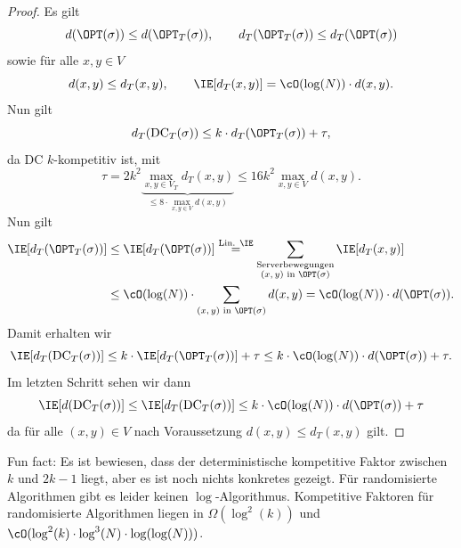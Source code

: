 \documentclass[language=ngerman,algolist]{TemplateLecture}
\begin{document}
\begin{proof}
    Es gilt
    \begin{equation*}
        d(\OPT(\sigma)) \leq d(\OPT_T(\sigma)), \quad \quad d_T(\OPT_T(\sigma)) \leq d_T(\OPT(\sigma))
    \end{equation*}
    sowie für alle $x, y  \in V$
    \begin{equation*}
        d(x,y) \leq d_T(x,y), \quad \quad \IE[d_T(x,y)] = \cO(\log(N)) \cdot d(x,y).
    \end{equation*}
    Nun gilt 
    \begin{equation*}
        d_T(\text{DC}_T(\sigma)) \leq k \cdot d_T(\OPT_T(\sigma)) + \tau,
    \end{equation*}
    da DC $k$-kompetitiv ist, mit 
    \begin{equation*}
        \tau = 2k^2 \underset{\leq 8\cdot\max_{x,y \in V} d(x,y)}{\underbrace{\max_{x,y \in V_T} d_T(x,y)}} \leq 16k^2 \max_{x,y \in V} d(x,y).
    \end{equation*}
    Nun gilt 
    \begin{equation*}
        \begin{split}
            \IE[d_T(\OPT_T(\sigma))] & \leq \IE[d_T(\OPT(\sigma))] \overset{\text{Lin. $\IE$}}{=} \sum_{\substack{\text{Serverbewegungen} \\ \text{$(x,y)$ in $\OPT(\sigma)$}}}\IE[d_T(x,y)] \\ 
            & \leq \cO(\log(N)) \cdot \sum_{\text{$(x,y)$ in $\OPT(\sigma)$}} d(x,y) = \cO(\log(N)) \cdot d(\OPT(\sigma)).
        \end{split}
    \end{equation*}
    Damit erhalten wir 
    \begin{equation*}
        \IE[d_T(\text{DC}_T(\sigma))] \leq k \cdot \IE[d_T(\OPT_T(\sigma))] + \tau \leq k \cdot \cO(\log(N)) \cdot d(\OPT(\sigma)) + \tau.
    \end{equation*}
    Im letzten Schritt sehen wir dann 
    \begin{equation*}
        \IE[d(\text{DC}_T(\sigma))] \leq \IE[d_T(\text{DC}_T(\sigma))] \leq k \cdot \cO(\log(N)) \cdot d(\OPT(\sigma)) + \tau
    \end{equation*}
    da für alle $(x,y) \in V$ nach Voraussetzung $d(x,y) \leq d_T(x,y)$ gilt.
\end{proof}

Fun fact: Es ist bewiesen, dass der deterministische kompetitive Faktor zwischen $k$ und $2k-1$ liegt, aber es ist noch nichts konkretes gezeigt. Für randomisierte Algorithmen gibt es leider keinen $\log$-Algorithmus. Kompetitive Faktoren für randomisierte Algorithmen liegen in $\Omega(\log^2(k))$ und $\cO(\log^2(k) \cdot \log^3(N) \cdot \log(\log(N)))$.
\end{document}
